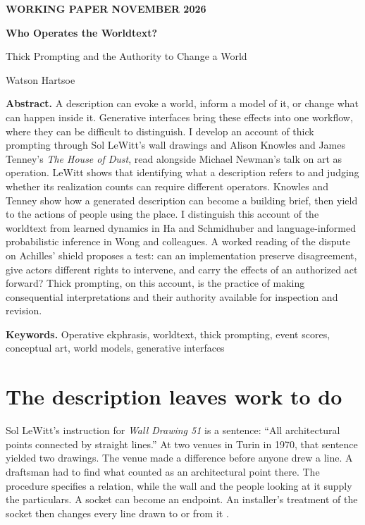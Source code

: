 \documentclass[11pt,letterpaper]{article}
\newcommand{\work}[1]{\textit{#1}}
\begin{document}
{\small\sffamily\bfseries WORKING PAPER \hfill NOVEMBER 2026\par}
\vspace{1.1em}
{\fontsize{29}{33}\selectfont\bfseries Who Operates the Worldtext?\par}
\vspace{0.25em}
{\large Thick Prompting and the Authority to Change a World\par}
\vspace{0.7em}
{\large Watson Hartsoe\par}
\vspace{0.5em}

\textbf{Abstract.} A description can evoke a world, inform a model of it, or change what can happen inside it. Generative interfaces bring these effects into one workflow, where they can be difficult to distinguish. I develop an account of thick prompting through Sol LeWitt’s wall drawings and Alison Knowles and James Tenney’s \work{The House of Dust}, read alongside Michael Newman’s talk on art as operation. LeWitt shows that identifying what a description refers to and judging whether its realization counts can require different operators. Knowles and Tenney show how a generated description can become a building brief, then yield to the actions of people using the place. I distinguish this account of the worldtext from learned dynamics in Ha and Schmidhuber and language-informed probabilistic inference in Wong and colleagues. A worked reading of the dispute on Achilles’ shield proposes a test: can an implementation preserve disagreement, give actors different rights to intervene, and carry the effects of an authorized act forward? Thick prompting, on this account, is the practice of making consequential interpretations and their authority available for inspection and revision.

\textbf{Keywords.} Operative ekphrasis, worldtext, thick prompting, event scores, conceptual art, world models, generative interfaces

\section{The description leaves work to do}

Sol LeWitt’s instruction for \work{Wall Drawing 51} is a sentence: “All architectural points connected by straight lines.” At two venues in Turin in 1970, that sentence yielded two drawings. The venue made a difference before anyone drew a line. A draftsman had to find what counted as an architectural point there. The procedure specifies a relation, while the wall and the people looking at it supply the particulars. A socket can become an endpoint. An installer’s treatment of the socket then changes every line drawn to or from it \citep{LeWitt51}.
\end{document}
